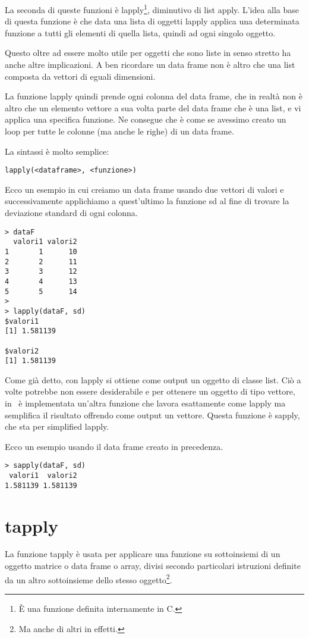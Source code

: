 La seconda di queste funzioni è \textsf{lapply}\footnote{È una funzione definita internamente in C.}, diminutivo di list apply. L'idea alla base di questa funzione è che data una lista di oggetti \textsf{lapply} applica una determinata funzione a tutti gli elementi di quella lista, quindi ad ogni singolo oggetto.

Questo oltre ad essere molto utile per oggetti che sono liste in senso stretto ha anche altre implicazioni. A ben ricordare un data frame non è altro che una list composta da vettori di eguali dimensioni.

La funzione lapply quindi prende ogni colonna del data frame, che in realtà non è altro che un elemento vettore a sua volta parte del data frame che è una list, e vi applica una specifica funzione. Ne consegue che è come se avessimo creato un loop per tutte le colonne (ma anche le righe) di un data frame.

La sintassi è molto semplice:
\begin{lstlisting}
lapply(<dataframe>, <funzione>)
\end{lstlisting}

Ecco un esempio in cui creiamo un data frame usando due vettori di valori e successivamente applichiamo a quest'ultimo la funzione \textsf{sd} al fine di trovare la deviazione standard di ogni colonna.

\begin{lstlisting}
> dataF
  valori1 valori2
1       1      10
2       2      11
3       3      12
4       4      13
5       5      14
>
> lapply(dataF, sd)
$valori1
[1] 1.581139

$valori2
[1] 1.581139
\end{lstlisting}

Come già detto, con \textsf{lapply} si ottiene come output un oggetto di classe list. Ciò a volte potrebbe non essere desiderabile e per ottenere un oggetto di tipo vettore, in \erre\ è implementata un'altra funzione che lavora esattamente come \textsf{lapply} ma semplifica il risultato offrendo come output un vettore. Questa funzione è \textsf{sapply}, che sta per simplified lapply.

Ecco un esempio usando il data frame creato in precedenza.

\begin{lstlisting}
> sapply(dataF, sd)
 valori1  valori2 
1.581139 1.581139 
\end{lstlisting}

\section{tapply}
La funzione \textsf{tapply} è usata per applicare una funzione su sottoinsiemi di un oggetto matrice o data frame o array, divisi secondo particolari istruzioni definite da un altro sottoinsieme dello stesso oggetto\footnote{Ma anche di altri in effetti.}. 

